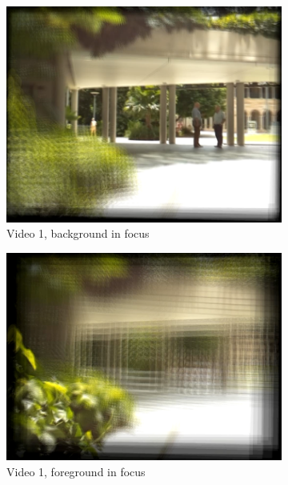 \documentclass{article} \usepackage{acra}
\begin{document}
\begin{figure}[H] \centering
  \begin{subfigure}[b]{0.73\columnwidth}
    \includegraphics[width=\textwidth]{images/vid_4}
    \caption{Video 1, background in focus}
  \end{subfigure}
  \begin{subfigure}[b]{0.73\columnwidth}
    \includegraphics[width=\textwidth]{images/vid_3}
    \caption{Video 1, foreground in focus}
  \end{subfigure}
  \begin{subfigure}[b]{0.73\columnwidth}

\end{subfigure}
\end{figure}
\end{document}
